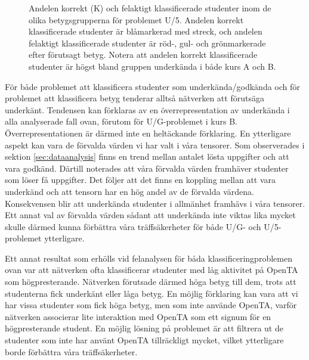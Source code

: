 \begin{figure}[hbtp]
    \centering
    \subfloat[Kurs A]{%
        \resizebox {0.49\textwidth}{!}{%
            
        }
        \label{fig:u5_ffm521}
    }
    \hfill
    \subfloat[Kurs B]{%
        \resizebox {0.49\textwidth}{!}{%
            
        }
        \label{fig:u5_ffm234}
    }
  \caption{Andelen korrekt (K) och felaktigt klassificerade studenter inom de olika betygsgrupperna för problemet U/5. Andelen korrekt klassificerade studenter är blåmarkerad med streck, och andelen felaktigt klassificerade studenter är röd-, gul- och grönmarkerade efter förutsagt betyg. Notera att andelen korrekt klassificerade studenter är högst bland gruppen underkända i både kurs A och B.}
  \label{fig:u5_ffm521_ffm234}
\end{figure}

För både problemet att klassificera studenter som underkända/godkända och för problemet att klassificera betyg tenderar alltså nätverken att förutsäga underkänt. Tendensen kan förklaras av en överrepresentation av underkända i alla analyserade fall ovan, förutom för U/G-problemet i kurs B. Överrepresentationen är därmed inte en heltäckande förklaring. En ytterligare aspekt kan vara de förvalda värden vi har valt i våra tensorer. Som observerades i sektion \ref{sec:dataanalysis} finns en trend mellan antalet lösta uppgifter och att vara godkänd. Därtill noterades att våra förvalda värden framhäver studenter som löser få uppgifter. Det följer att det finns en koppling mellan att vara underkänd och att tensorn har en hög andel av de förvalda värdena. Konsekvensen blir att underkända studenter i allmänhet framhävs i våra tensorer. Ett annat val av förvalda värden sådant att underkända inte viktas lika mycket skulle därmed kunna förbättra våra träffsäkerheter för både U/G- och U/5-problemet ytterligare.

Ett annat resultat som erhölls vid felanalysen för båda klassificeringproblemen ovan var att nätverken ofta klassificerar studenter med låg aktivitet på OpenTA som högpresterande. Nätverken förutsade därmed höga betyg till dem, trots att studenterna fick underkänt eller låga betyg. En möjlig förklaring kan vara att vi har vissa studenter som fick höga betyg, men som inte använde OpenTA, varför nätverken associerar lite interaktion med OpenTA som ett signum för en högpresterande student. En möjlig lösning på problemet är att filtrera ut de studenter som inte har använt OpenTA tillräckligt mycket, vilket ytterligare borde förbättra våra träffsäkerheter.

